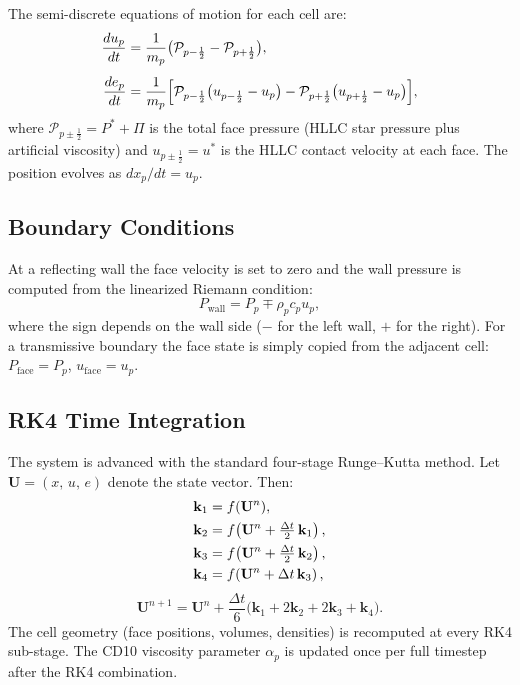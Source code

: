 \documentclass[twocolumn]{aastex63}
\newcommand{\vel}{{u}}
\begin{document}
The semi-discrete equations of motion for each cell are:
\begin{align}
  \frac{d\vel_p}{dt} &= \frac{1}{m_p}
    \bigl(\mathcal{P}_{p-\frac{1}{2}} - \mathcal{P}_{p+\frac{1}{2}}\bigr),
    \label{eq:dvdt}\\[4pt]
  \frac{de_p}{dt} &= \frac{1}{m_p}
    \Bigl[\mathcal{P}_{p-\frac{1}{2}}
      \bigl(\vel_{p-\frac{1}{2}} - \vel_p\bigr)
    - \mathcal{P}_{p+\frac{1}{2}}
      \bigl(\vel_{p+\frac{1}{2}} - \vel_p\bigr)\Bigr],
    \label{eq:dedt}
\end{align}
where $\mathcal{P}_{p\pm\frac{1}{2}} = P^* + \Pi$ is the total face
pressure (HLLC star pressure plus artificial viscosity) and
$\vel_{p\pm\frac{1}{2}} = \vel^*$ is the HLLC contact velocity at
each face.
The position evolves as $dx_p/dt = \vel_p$.


\subsection{Boundary Conditions}

At a reflecting wall the face velocity is set to zero and
the wall pressure is computed from the
linearized Riemann condition:
\begin{equation}
  P_\mathrm{wall} = P_p \mp \rho_p c_p \vel_p,
\end{equation}
where the sign depends on the wall side
($-$ for the left wall, $+$ for the right).
For a transmissive boundary the face state is simply copied from
the adjacent cell: $P_\mathrm{face} = P_p$, $\vel_\mathrm{face} = \vel_p$.


\subsection{RK4 Time Integration}

The system is advanced with the standard four-stage Runge--Kutta method.
Let $\mathbf{U} = (x,\,\vel,\,e)$ denote the state vector.  Then:
\begin{align}
  \mathbf{k}_1 &= f(\mathbf{U}^n), \notag\\
  \mathbf{k}_2 &= f\!\left(\mathbf{U}^n + \tfrac{\Delta t}{2}\,\mathbf{k}_1\right), \notag\\
  \mathbf{k}_3 &= f\!\left(\mathbf{U}^n + \tfrac{\Delta t}{2}\,\mathbf{k}_2\right), \notag\\
  \mathbf{k}_4 &= f\!\left(\mathbf{U}^n + \Delta t\,\mathbf{k}_3\right),
\end{align}
\begin{equation}
  \mathbf{U}^{n+1} = \mathbf{U}^n
    + \frac{\Delta t}{6}\bigl(\mathbf{k}_1
      + 2\mathbf{k}_2 + 2\mathbf{k}_3 + \mathbf{k}_4\bigr).
\end{equation}
The cell geometry (face positions, volumes, densities) is recomputed
at every RK4 sub-stage.
The CD10 viscosity parameter $\alpha_p$ is updated once per full
timestep after the RK4 combination.
\end{document}
